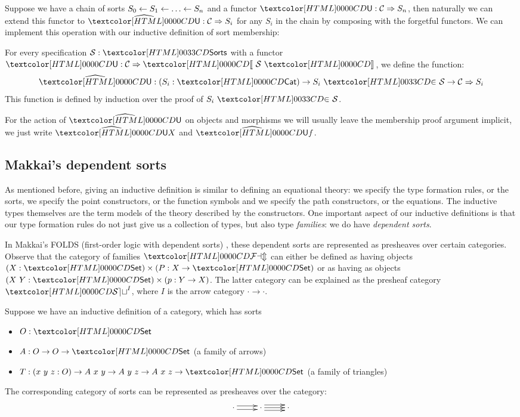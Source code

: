 Suppose we have a chain of sorts
$S_0 \leftarrow S_1 \leftarrow \hdots \leftarrow S_n$ and a functor
$\Und : \Func{\Cc}{S_n}$, then naturally we can extend this functor to
$\extendfunc{\Und} : \Func{\Cc}{S_i}$ for any $S_i$ in the chain by
composing with the forgetful functors. We can implement this operation
with our inductive definition of sort membership:

\begin{definition}
  For every specification $\Ss : \sortsty$ with a functor
  $\Und : \Func{\Cc}{\SortCat{\Ss}}$, we define the function:
  $$
  \extendfunc{\Und} : (S_i : \Cat) \to \sortsin{S_i}{\Ss} \to
  \Func{\Cc}{S_i}
  $$
  This function is defined by induction over the proof of
  $\sortsin{S_i}{\Ss}$. 

  For the action of $\extendfunc{\Und}$ on objects and morphisms we
  will usually leave the membership proof argument implicit, \eg we
  just write $\extendfunc{\Und} X$ and $\extendfunc{\Und} f$.
\end{definition}

\subsection{Makkai's dependent sorts}

As mentioned before, giving an inductive definition is similar to
defining an equational theory: we specify the type formation rules, or
the sorts, we specify the point constructors, or the function symbols
and we specify the path constructors, or the equations. The inductive
types themselves are the term models of the theory described by the
constructors. One important aspect of our inductive definitions is
that our type formation rules do not just give us a collection of
types, but also type \emph{families}: we do have \emph{dependent
  sorts}.

In Makkai's FOLDS (first-order logic with dependent sorts) \cite{Makkai1995}, these
dependent sorts are represented as presheaves over certain
categories. Observe that the category of families $\FAM$ can either be
defined as having objects $(X : \Set) \times (P : X \to \Set)$ or as
having as objects $(X\ Y : \Set) \times (p : Y \to X)$. The latter
category can be explained as the presheaf category $\SET^I$, where $I$
is the arrow category $\cdot \to \cdot$.

\begin{example}
  Suppose we have an inductive definition of a category, which has
  sorts
%
  \begin{itemize}
  \item $O : \Set$
  \item $A : O \to O \to \Set$ (a family of arrows)
  \item $T : (x\ y\ z : O) \to A\ x\ y \to A\ y\ z \to A\ x\ z \to \Set$
    (a family of triangles)
  \end{itemize}
%
  The corresponding category of sorts can be represented as presheaves
  over the category:
$$
\xymatrix{ \cdot \ar@<-.5ex>[r] \ar@<.5ex>[r] &\cdot \ar@<-.75ex>[r]
  \ar@<.0ex>[r] \ar@<.75ex>[r] &\cdot }
$$
\end{example}


